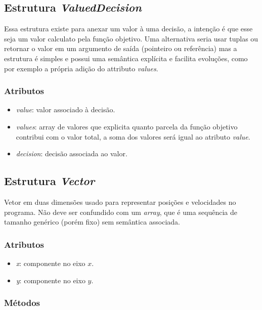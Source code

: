 \subsection*{Estrutura \textit{ValuedDecision}}

Essa estrutura existe para anexar um valor à uma decisão, a intenção é que esse
seja um valor calculato pela função objetivo.  Uma alternativa seria usar tuplas
ou retornar o valor em um argumento de saída (pointeiro ou referência) mas a
estrutura é simples e possui uma semântica explícita e facilita evoluções, como
por exemplo a própria adição do attributo \textit{values}.

\subsubsection*{Atributos}

\begin{itemize}
  \item \textit{value}: valor associado à decisão.
  \item \textit{values}: array de valores que explicita quanto parcela da função
    objetivo contribui com o valor total, a soma dos valores será igual ao
    atributo \textit{value}.
  \item \textit{decision}: decisão associada ao valor.
\end{itemize}


\subsection*{Estrutura \textit{Vector}}

Vetor em duas dimensões usado para representar posições e velocidades no
programa.  Não deve ser confundido com um \textit{array}, que é uma sequência
de tamanho genérico (porém fixo) sem semântica associada.

\subsubsection*{Atributos}

\begin{itemize}
  \item \textit{x}: componente no eixo $x$.
  \item \textit{y}: componente no eixo $y$.
\end{itemize}

\subsubsection*{Métodos}

